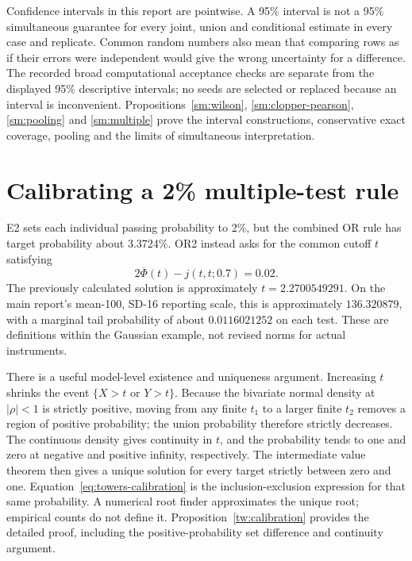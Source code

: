 Confidence intervals in this report are pointwise. A 95\% interval is not a
95\% simultaneous guarantee for every joint, union and conditional estimate
in every case and replicate. Common random numbers also mean that comparing
rows as if their errors were independent would give the wrong uncertainty
for a difference. The recorded broad computational acceptance checks are
separate from the displayed 95\% descriptive intervals; no seeds are selected
or replaced because an interval is inconvenient.
Propositions~\ref{sm:wilson}, \ref{sm:clopper-pearson}, \ref{sm:pooling} and
\ref{sm:multiple} prove the interval constructions, conservative exact
coverage, pooling and the limits of simultaneous interpretation.

\chapter{Calibrating a 2\% multiple-test rule}

E2 sets each individual passing probability to 2\%, but the combined OR rule
has target probability about 3.3724\%. OR2 instead asks for the common cutoff
\(t\) satisfying
\begin{equation}
 2\overline\Phi(t)-j(t,t;0.7)=0.02.
 \label{eq:towers-calibration}
\end{equation}
The previously calculated solution is approximately
\(t=2.2700549291\). On the main report's mean-100, SD-16 reporting scale,
this is approximately \(136.320879\), with a marginal tail probability of
about \(0.0116021252\) on each test. These are definitions within the
Gaussian example, not revised norms for actual instruments.

\begingroup
\let\subsection\section

\endgroup

There is a useful model-level existence and uniqueness argument. Increasing
\(t\) shrinks the event \(\{X>t\text{ or }Y>t\}\). Because the bivariate
normal density at \(|\rho|<1\) is strictly positive, moving from any finite
\(t_1\) to a larger finite \(t_2\) removes a region of positive probability;
the union probability therefore strictly decreases. The continuous density
gives continuity in \(t\), and the probability tends to one and zero at
negative and positive infinity, respectively. The intermediate value theorem
then gives a unique solution for every target strictly between zero and one.
Equation~\eqref{eq:towers-calibration} is the inclusion-exclusion expression
for that same probability. A numerical root finder approximates the unique
root; empirical counts do not define it.
Proposition~\ref{tw:calibration} provides the detailed proof, including
the positive-probability set difference and continuity argument.

